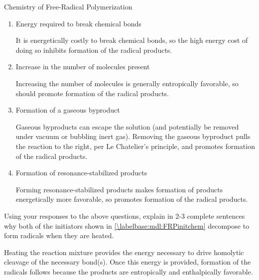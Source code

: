 \begin{activity}{Chemistry of Free-Radical Polymerization}
\begin{exercises}
		\begin{enumerate}
			\item Energy required to break chemical bonds
	
				\begin{solution}
					It is energetically costly to break chemical bonds, so the high energy cost of doing so inhibits formation of the radical products.
				\end{solution}
			
			\item Increase in the number of molecules present
	
				\begin{solution}
					Increasing the number of molecules is generally entropically favorable, so should promote formation of the radical products.
				\end{solution}
			
			\item Formation of a gaseous byproduct
	
				\begin{solution}
					Gaseous byproducts can escape the solution (and potentially be removed under vacuum or bubbling inert gas).  Removing the gaseous byproduct pulls the reaction to the right, per Le Chatelier's principle, and promotes formation of the radical products.
				\end{solution}
			
			\item Formation of resonance-stabilized products
	
				\begin{solution}
					Forming resonance-stabilized products makes formation of products energetically more favorable, so promotes formation of the radical products.
				\end{solution}
		\end{enumerate}
		
		Using your responses to the above questions, explain in 2-3 complete sentences why both of the initiators shown in \ref{\labelbase:mdl:FRPinitchem} decompose to form radicals when they are heated.
		
	
				\begin{solution}
					Heating the reaction mixture provides the energy necessary to drive homolytic cleavage of the necessary bond(s).  Once this energy is provided, formation of the radicals follows because the products are entropically and enthalpically favorable.
				\end{solution}


\end{exercises}
\end{activity}
